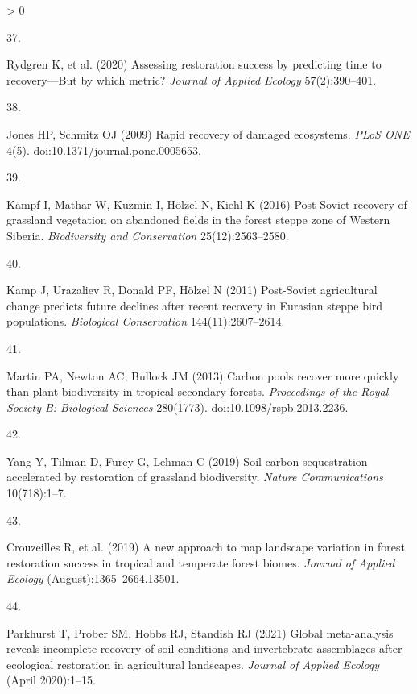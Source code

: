 \documentclass[9pt,twocolumn,twoside,]{pnas-new}
\newlength{\csllabelwidth}
\newlength{\cslhangindent}
\newenvironment{CSLReferences}[2] %
 {%
  \setlength{\parindent}{0pt}
  \ifodd #1 \everypar{\setlength{\hangindent}{\cslhangindent}}\ignorespaces\fi
  \ifnum #2 > 0
  \setlength{\parskip}{#2\baselineskip}
  \fi
 }%
 {}
\newcommand{\CSLLeftMargin}[1]{\parbox[t]{\csllabelwidth}{#1}}
\newcommand{\CSLRightInline}[1]{\parbox[t]{\linewidth - \csllabelwidth}{#1}\break}
\begin{document}
\begin{CSLReferences}{0}{0}
\leavevmode\hypertarget{ref-Rydgren2020}{}%
\CSLLeftMargin{37. }
\CSLRightInline{Rydgren K, et al. (2020) {Assessing restoration success by predicting time to recovery---But by which metric?} \emph{Journal of Applied Ecology} 57(2):390--401.}

\leavevmode\hypertarget{ref-Jones2009}{}%
\CSLLeftMargin{38. }
\CSLRightInline{Jones HP, Schmitz OJ (2009) {Rapid recovery of damaged ecosystems}. \emph{PLoS ONE} 4(5). doi:\href{https://doi.org/10.1371/journal.pone.0005653}{10.1371/journal.pone.0005653}.}

\leavevmode\hypertarget{ref-Kampf2016}{}%
\CSLLeftMargin{39. }
\CSLRightInline{Kämpf I, Mathar W, Kuzmin I, Hölzel N, Kiehl K (2016) {Post-Soviet recovery of grassland vegetation on abandoned fields in the forest steppe zone of Western Siberia}. \emph{Biodiversity and Conservation} 25(12):2563--2580.}

\leavevmode\hypertarget{ref-Kamp2011}{}%
\CSLLeftMargin{40. }
\CSLRightInline{Kamp J, Urazaliev R, Donald PF, Hölzel N (2011) {Post-Soviet agricultural change predicts future declines after recent recovery in Eurasian steppe bird populations}. \emph{Biological Conservation} 144(11):2607--2614.}

\leavevmode\hypertarget{ref-Martin2013}{}%
\CSLLeftMargin{41. }
\CSLRightInline{Martin PA, Newton AC, Bullock JM (2013) {Carbon pools recover more quickly than plant biodiversity in tropical secondary forests}. \emph{Proceedings of the Royal Society B: Biological Sciences} 280(1773). doi:\href{https://doi.org/10.1098/rspb.2013.2236}{10.1098/rspb.2013.2236}.}

\leavevmode\hypertarget{ref-Yang2019}{}%
\CSLLeftMargin{42. }
\CSLRightInline{Yang Y, Tilman D, Furey G, Lehman C (2019) {Soil carbon sequestration accelerated by restoration of grassland biodiversity}. \emph{Nature Communications} 10(718):1--7.}

\leavevmode\hypertarget{ref-Crouzeilles2019}{}%
\CSLLeftMargin{43. }
\CSLRightInline{Crouzeilles R, et al. (2019) {A new approach to map landscape variation in forest restoration success in tropical and temperate forest biomes}. \emph{Journal of Applied Ecology} (August):1365--2664.13501.}

\leavevmode\hypertarget{ref-Parkhurst2021}{}%
\CSLLeftMargin{44. }
\CSLRightInline{Parkhurst T, Prober SM, Hobbs RJ, Standish RJ (2021) {Global meta-analysis reveals incomplete recovery of soil conditions and invertebrate assemblages after ecological restoration in agricultural landscapes}. \emph{Journal of Applied Ecology} (April 2020):1--15.}


\end{CSLReferences}
\end{document}
